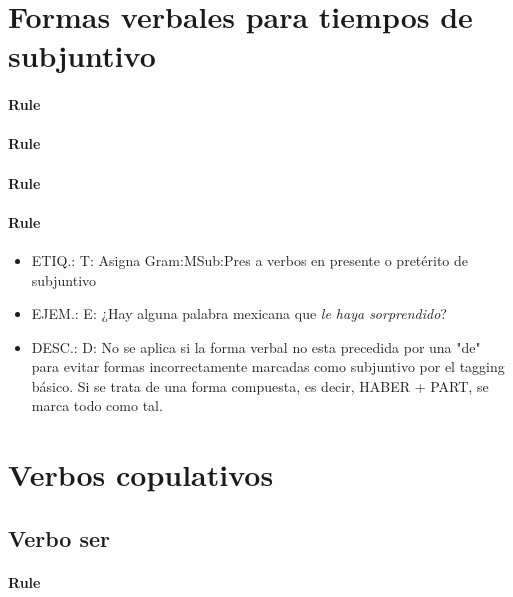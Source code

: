 \documentclass[11pt]{report}
\begin{document}
\section{Formas verbales para tiempos de subjuntivo}
\paragraph*{Rule}
\paragraph*{Rule}
\paragraph*{Rule}
\paragraph*{Rule}
\begin{itemize}
\item ETIQ.:  T: Asigna Gram:MSub:Pres a verbos en presente o pretérito de subjuntivo
\item EJEM.:  E: ¿Hay alguna palabra mexicana que \emph{le haya sorprendido}?
\item DESC.:  D: No se aplica si la forma verbal no esta precedida por una "de" para evitar formas incorrectamente marcadas como subjuntivo por el tagging básico. Si se trata de una forma compuesta, es decir, HABER + PART, se marca todo como tal.
\end{itemize}

\section{Verbos copulativos}
\subsection{Verbo ser}
\paragraph*{Rule}
\end{document}
